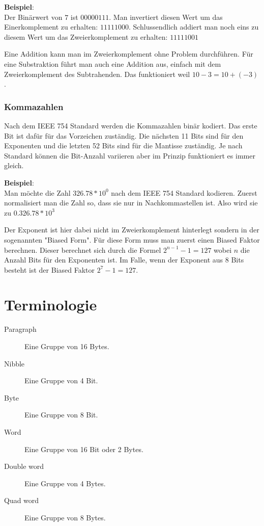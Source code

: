\documentclass[12pt, a4paper, oneside]{article}
\begin{document}
{\bf Beispiel}:\\
Der Binärwert von $7$ ist $0000 0111$. Man invertiert diesen Wert um das Einerkomplement zu erhalten: $1111 1000$. Schlussendlich addiert man noch eins zu diesem Wert um das Zweierkomplement zu erhalten: $1111 1001$

Eine Addition kann man im Zweierkomplement ohne Problem durchführen. Für eine Substraktion führt man auch eine Addition aus, einfach mit dem Zweierkomplement des Subtrahenden. Das funktioniert weil $10 - 3 = 10 + (-3)$.

\subsubsection{Kommazahlen}
Nach dem IEEE 754 Standard werden die Kommazahlen binär kodiert. Das erste Bit ist dafür für das Vorzeichen zuständig. Die nächsten 11 Bits sind für den Exponenten und die letzten 52 Bits sind für die Mantisse zuständig. Je nach Standard können die Bit-Anzahl variieren aber im Prinzip funktioniert es immer gleich.


{\bf Beispiel}:\\
Man möchte die Zahl $326.78 * 10^{0}$ nach dem IEEE 754 Standard kodieren. Zuerst normalisiert man die Zahl so, dass sie nur in Nachkommastellen ist. Also wird sie zu $0.326.78 * 10^{3}$

Der Exponent ist hier dabei nicht im Zweierkomplement hinterlegt sondern in der sogenannten "Biased Form". Für diese Form muss man zuerst einen Biased Faktor berechnen. Dieser berechnet sich durch die Formel $2^{n-1}-1 = 127$ wobei $n$ die Anzahl Bits für den Exponenten ist. Im Falle, wenn der Exponent aus 8 Bits besteht ist der Biased Faktor $2^{7} -1 = 127$.



\newpage
\section{Terminologie}
\begin{description}
  \item[Paragraph] Eine Gruppe von 16 Bytes.
  \item[Nibble] Eine Gruppe von 4 Bit.
  \item[Byte] Eine Gruppe von 8 Bit.
  \item[Word] Eine Gruppe von 16 Bit oder 2 Bytes.
  \item[Double word] Eine Gruppe von 4 Bytes.
  \item[Quad word] Eine Gruppe von 8 Bytes.
\end{description}
\end{document}
